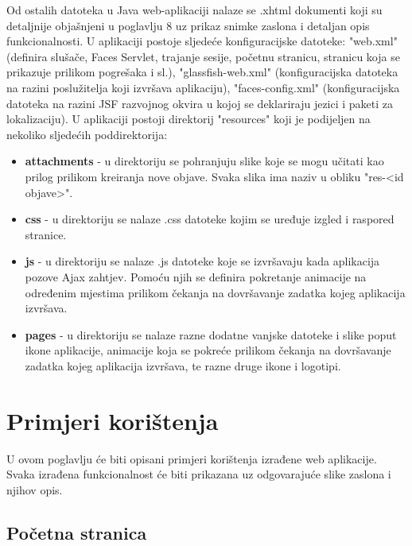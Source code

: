 \documentclass{foi}
\begin{document}
Od ostalih datoteka u Java web-aplikaciji nalaze se .xhtml dokumenti koji su detaljnije objašnjeni u poglavlju 8 uz prikaz snimke zaslona i detaljan opis funkcionalnosti. U aplikaciji postoje sljedeće konfiguracijske datoteke: "web.xml" (definira slušače, Faces Servlet, trajanje sesije, početnu stranicu, stranicu koja se prikazuje prilikom pogrešaka i sl.), "glassfish-web.xml" (konfiguracijska datoteka na razini poslužitelja koji izvršava aplikaciju), "faces-config.xml" (konfiguracijska datoteka na razini JSF razvojnog okvira u kojoj se deklariraju jezici i paketi za lokalizaciju). U aplikaciji postoji direktorij "resources" koji je podijeljen na nekoliko sljedećih poddirektorija:
\begin{itemize}
\item \textbf{attachments} - u direktoriju se pohranjuju slike koje se mogu učitati kao prilog prilikom kreiranja nove objave. Svaka slika ima naziv u obliku "res-<id objave>".
\item \textbf{css} - u direktoriju se nalaze .css datoteke kojim se uređuje izgled i raspored stranice.
\item \textbf{js} - u direktoriju se nalaze .js datoteke koje se izvršavaju kada aplikacija pozove Ajax zahtjev. Pomoću njih se definira pokretanje animacije na određenim mjestima prilikom čekanja na dovršavanje zadatka kojeg aplikacija izvršava.
\item \textbf{pages} - u direktoriju se nalaze razne dodatne vanjske datoteke i slike poput ikone aplikacije, animacije koja se pokreće prilikom čekanja na dovršavanje zadatka kojeg aplikacija izvršava, te razne druge ikone i logotipi.
\end{itemize}

\chapter{Primjeri korištenja}

U ovom poglavlju će biti opisani primjeri korištenja izrađene web aplikacije. Svaka izrađena funkcionalnost će biti prikazana uz odgovarajuće slike zaslona i njihov opis.

\section{Početna stranica}
\end{document}
